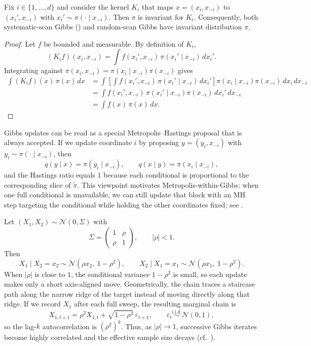 \begin{proposition}
\label{prop:gibbs-invariant}
Fix $i\in\{1,\dots,d\}$ and consider the kernel $K_i$ that maps $x=(x_i,x_{-i})$ to $(x_i',x_{-i})$ with $x_i'\sim \pi(\cdot\mid x_{-i})$.
Then $\pi$ is invariant for $K_i$.
Consequently, both systematic-scan Gibbs () and random-scan Gibbs have invariant distribution $\pi$.
\end{proposition}
\begin{proof}
Let $f$ be bounded and measurable.
By definition of $K_i$,
\[
  (K_if)(x_i,x_{-i})=\int f(x_i',x_{-i})\,\pi(x_i'\mid x_{-i})\,dx_i'.
\]
Integrating against $\pi(x_i,x_{-i})=\pi(x_i\mid x_{-i})\pi(x_{-i})$ gives
\begin{align*}
  \int (K_if)(x)\,\pi(x)\,dx
  &=
  \int \left[\int f(x_i',x_{-i})\,\pi(x_i'\mid x_{-i})\,dx_i'\right]\pi(x_i\mid x_{-i})\pi(x_{-i})\,dx_i\,dx_{-i}\\
  &=
  \int f(x_i',x_{-i})\,\pi(x_i'\mid x_{-i})\pi(x_{-i})\,dx_i'\,dx_{-i}\\
  &=
  \int f(x)\,\pi(x)\,dx.
\end{align*}
\end{proof}

Gibbs updates can be read as a special Metropolis--Hastings proposal that is always accepted.
If we update coordinate $i$ by proposing $y=(y_i,x_{-i})$ with $y_i\sim \pi(\cdot\mid x_{-i})$, then
\[
  q(y\mid x)=\pi(y_i\mid x_{-i}),
  \qquad
  q(x\mid y)=\pi(x_i\mid x_{-i}),
\]
and the Hastings ratio equals $1$ because each conditional is proportional to the corresponding slice of $\tilde\pi$.
This viewpoint motivates Metropolis-within-Gibbs: when one full conditional is unavailable, we can still update that block with an MH step targeting the conditional while holding the other coordinates fixed; see \citet[\S6.3.2]{liu_2002_monte_carlo}.

\begin{example}
\label{subsubsec:gibbs-bivar-normal}
Let $(X_1,X_2)\sim \mathcal{N}(0,\Sigma)$ with
\[
  \Sigma=\begin{pmatrix}
    1 & \rho\\
    \rho & 1
  \end{pmatrix},
  \qquad |\rho|<1.
\]
Then
\[
  X_1\mid X_2=x_2 \sim \mathcal{N}\!\left(\rho x_2,\ 1-\rho^2\right),
  \qquad
  X_2\mid X_1=x_1 \sim \mathcal{N}\!\left(\rho x_1,\ 1-\rho^2\right).
\]
When $|\rho|$ is close to $1$, the conditional variance $1-\rho^2$ is small, so each update makes only a short axis-aligned move.
Geometrically, the chain traces a staircase path along the narrow ridge of the target instead of moving directly along that ridge.
If we record $X_1$ after each full sweep, the resulting marginal chain is
\[
  X_{1,t+1} = \rho^2 X_{1,t} + \sqrt{1-\rho^4}\,\varepsilon_{t+1},
  \qquad \varepsilon_t \overset{\mathrm{i.i.d.}}{\sim} \mathcal{N}(0,1),
\]
so the lag-$k$ autocorrelation is $(\rho^2)^k$.
Thus, as $|\rho|\to 1$, successive Gibbs iterates become highly correlated and the effective sample size decays (cf.\ ).
\end{example}

